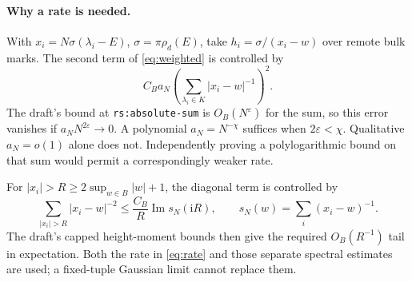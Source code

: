 \documentclass[11pt]{article}
\numberwithin{equation}{section}
\theoremstyle{definition}
\theoremstyle{remark}
\newcommand{\ii}{\mathrm i}
\begin{document}
\paragraph{Why a rate is needed.}
With $x_i=N\sigma(\lambda_i-E)$, $\sigma=\pi\rho_d(E)$, take
$h_i=\sigma/(x_i-w)$ over remote bulk marks. The second term of
\eqref{eq:weighted} is controlled by
\begin{equation}\label{eq:rate}
 C_Ba_N\left(\sum_{\lambda_i\in K}|x_i-w|^{-1}\right)^2.
\end{equation}
The draft's bound at \texttt{rs:absolute-sum} is $O_B(N^\varepsilon)$
for the sum, so this error vanishes if
$a_NN^{2\varepsilon}\to0$. A polynomial $a_N=N^{-\chi}$ suffices
when $2\varepsilon<\chi$. Qualitative $a_N=o(1)$ alone does not.
Independently proving a polylogarithmic bound on that sum would permit
a correspondingly weaker rate.

For $|x_i|>R\geq2\sup_{w\in B}|w|+1$, the diagonal term is controlled by
\[
 \sum_{|x_i|>R}|x_i-w|^{-2}
 \leq\frac{C_B}{R}\operatorname{Im}s_N(\ii R),\qquad
 s_N(w)=\sum_i(x_i-w)^{-1}.
\]
The draft's capped height-moment bounds then give the required $O_B(R^{-1})$
tail in expectation. Both the rate in \eqref{eq:rate} and those separate
spectral estimates are used; a fixed-tuple Gaussian limit cannot replace
them.
\end{document}
